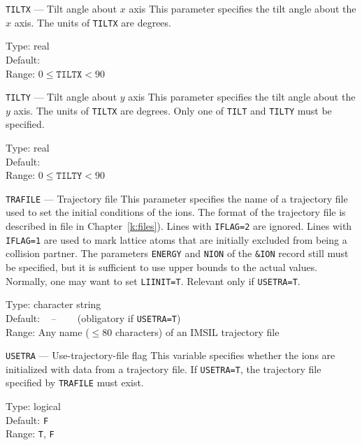 \begin{keydescription}{\texttt{TILTX} --- Tilt angle about $x$ axis}
%
  This parameter specifies the tilt angle about the $x$ axis. The units of
  \texttt{TILTX} are degrees.
%
  \begin{keytab}
    Type:    \> real \\
    Default:  \\
    Range:   \> $0 \le \texttt{TILTX} < 90$
  \end{keytab}
\end{keydescription}

\begin{keydescription}{\texttt{TILTY} --- Tilt angle about $y$ axis}
%
  This parameter specifies the tilt angle about the $y$ axis. The units of
  \texttt{TILTX} are degrees. Only one of \texttt{TILT} and \texttt{TILTY} 
  must be specified.
%
  \begin{keytab}
    Type:    \> real \\
    Default:  \\
    Range:   \> $0 \le \texttt{TILTY} < 90$
  \end{keytab}
\end{keydescription}

\begin{keydescription}{\texttt{TRAFILE} --- Trajectory file}
%
  This parameter specifies the name of a trajectory file used to set the
  initial conditions of the ions. The format of the trajectory file
  is described in file in Chapter~\ref{k:files}). Lines with
  \texttt{IFLAG=2} are ignored. Lines with \texttt{IFLAG=1} are used to
  mark lattice atoms that are initially excluded from being a collision
  partner. The parameters \texttt{ENERGY} and \texttt{NION} of the
  \texttt{\&ION} record still must be specified, but it is sufficient to use
  upper bounds to the actual values. Normally, one may want to set
  \texttt{LIINIT=T}. Relevant only if \texttt{USETRA=T}.
  \begin{keytab}
    Type:    \> character string \\
    Default: \> ~ -- ~~~ (obligatory if \texttt{USETRA=T}) \\
    Range:   \> Any name ($\le 80$ characters) of an IMSIL trajectory file
  \end{keytab}
\end{keydescription}

\begin{keydescription}{\texttt{USETRA} --- Use-trajectory-file flag}
%
  This variable specifies whether the ions are initialized with data from a
  trajectory file. If \texttt{USETRA=T}, the trajectory file specified by
  \texttt{TRAFILE} must exist.
%
  \begin{keytab}
    Type:    \> logical \\
    Default: \> \texttt{F} \\
    Range:   \> \texttt{T}, \texttt{F}
  \end{keytab}
\end{keydescription}

